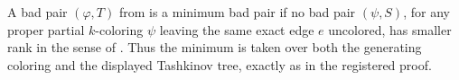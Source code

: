 \begin{definition}
A bad pair \((\varphi,T)\) from  is a minimum bad
pair if no bad pair \((\psi,S)\), for any proper partial \(k\)-coloring
\(\psi\) leaving the same exact edge \(e\) uncolored, has smaller rank in
the sense of .  Thus the minimum is taken over
both the generating coloring and the displayed Tashkinov tree, exactly as
in the registered proof.
\end{definition}
